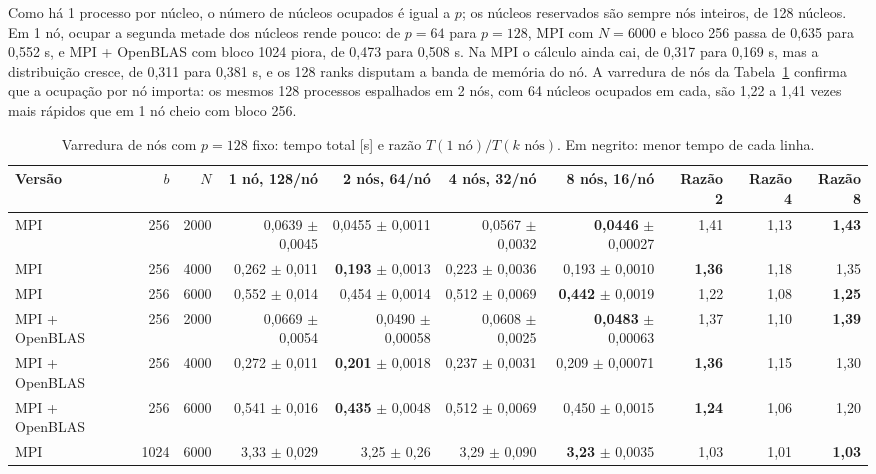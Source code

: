 \documentclass[Portugues]{ic-tese-v3}
\DeclareRobustCommand{\_}{\textunderscore\allowbreak} %
\begin{document}
\FloatBarrier
Como há 1 processo por núcleo, o número de núcleos ocupados é igual a $p$; os núcleos reservados são sempre nós inteiros, de 128 núcleos. Em 1 nó, ocupar a segunda metade dos núcleos rende pouco: de $p=64$ para $p=128$, MPI com $N=6000$ e bloco 256 passa de 0,635 para 0,552 s, e MPI + OpenBLAS com bloco 1024 piora, de 0,473 para 0,508 s. Na MPI o cálculo ainda cai, de 0,317 para 0,169 s, mas a distribuição cresce, de 0,311 para 0,381 s, e os 128 ranks disputam a banda de memória do nó. A varredura de nós da Tabela~\ref{tab:nos} confirma que a ocupação por nó importa: os mesmos 128 processos espalhados em 2 nós, com 64 núcleos ocupados em cada, são 1,22 a 1,41 vezes mais rápidos que em 1 nó cheio com bloco 256.

\begin{table}[H]
\centering\footnotesize
\renewcommand{\arraystretch}{1.05}\setlength{\tabcolsep}{1.5pt}
\begin{tabular}{|l|r|r|r|r|r|r|r|r|r|}
\hline
\textbf{Versão} & \textbf{$b$} & \textbf{$N$} & \textbf{1 nó, 128/nó} & \textbf{2 nós, 64/nó} & \textbf{4 nós, 32/nó} & \textbf{8 nós, 16/nó} & \textbf{Razão 2} & \textbf{Razão 4} & \textbf{Razão 8} \\
\hline\hline
MPI & 256 & 2000 & 0,0639 $\pm$ 0,0045 & 0,0455 $\pm$ 0,0011 & 0,0567 $\pm$ 0,0032 & \textbf{0,0446} $\pm$ 0,00027 & 1,41 & 1,13 & \textbf{1,43} \\ \hline
MPI & 256 & 4000 & 0,262 $\pm$ 0,011 & \textbf{0,193} $\pm$ 0,0013 & 0,223 $\pm$ 0,0036 & 0,193 $\pm$ 0,0010 & \textbf{1,36} & 1,18 & 1,35 \\ \hline
MPI & 256 & 6000 & 0,552 $\pm$ 0,014 & 0,454 $\pm$ 0,0014 & 0,512 $\pm$ 0,0069 & \textbf{0,442} $\pm$ 0,0019 & 1,22 & 1,08 & \textbf{1,25} \\ \hline\hline
MPI + OpenBLAS & 256 & 2000 & 0,0669 $\pm$ 0,0054 & 0,0490 $\pm$ 0,00058 & 0,0608 $\pm$ 0,0025 & \textbf{0,0483} $\pm$ 0,00063 & 1,37 & 1,10 & \textbf{1,39} \\ \hline
MPI + OpenBLAS & 256 & 4000 & 0,272 $\pm$ 0,011 & \textbf{0,201} $\pm$ 0,0018 & 0,237 $\pm$ 0,0031 & 0,209 $\pm$ 0,00071 & \textbf{1,36} & 1,15 & 1,30 \\ \hline
MPI + OpenBLAS & 256 & 6000 & 0,541 $\pm$ 0,016 & \textbf{0,435} $\pm$ 0,0048 & 0,512 $\pm$ 0,0069 & 0,450 $\pm$ 0,0015 & \textbf{1,24} & 1,06 & 1,20 \\ \hline\hline
MPI & 1024 & 6000 & 3,33 $\pm$ 0,029 & 3,25 $\pm$ 0,26 & 3,29 $\pm$ 0,090 & \textbf{3,23} $\pm$ 0,0035 & 1,03 & 1,01 & \textbf{1,03} \\ \hline
\end{tabular}
\caption{Varredura de nós com $p=128$ fixo: tempo total [s] e razão $T(1\text{ nó})/T(k\text{ nós})$. Em negrito: menor tempo de cada linha.}
\label{tab:nos}
\end{table}
\end{document}
